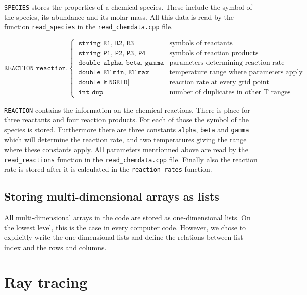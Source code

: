 \documentclass[]{article}
\begin{document}
\texttt{SPECIES} stores the properties of a chemical species. These include the symbol of the species, its abundance and its molar mass. All this data is read by the function \texttt{read\_species} in the \texttt{read\_chemdata.cpp} file.

\begin{equation}
\texttt{REACTION reaction.}
\begin{cases}
\ \texttt{string R1, R2, R3} & \text{symbols of reactants}\\
\ \texttt{string P1, P2, P3, P4} & \text{symbols of reaction products} \\
\ \texttt{double alpha, beta, gamma} &  \text{parameters determining reaction rate} \\
\ \texttt{double RT\_min, RT\_max} &  \text{temperature range where parameters apply} \\
\ \texttt{double k[NGRID]} &  \text{reaction rate at every grid point} \\
\ \texttt{int    dup} &  \text{number of duplicates in other T ranges}
\end{cases}
\end{equation}

\texttt{REACTION} contains the information on the chemical reactions. There is place for three reactants and four reaction products. For each of those the symbol of the species is stored. Furthermore there are three constants \texttt{alpha}, \texttt{beta} and \texttt{gamma} which will determine the reaction rate, and two temperatures giving the range where these constants apply. All parameters mentionned above are read by the \texttt{read\_reactions} function in the \texttt{read\_chemdata.cpp} file. Finally also the reaction rate is stored after it is calculated in the \texttt{reaction\_rates} function.


\subsection{Storing multi-dimensional arrays as lists}

All multi-dimensional arrays in the code are stored as one-dimensional lists. On the lowest level, this is the case in every computer code. However, we chose to explicitly write the one-dimensional lists and define the relations between list index and the rows and columns.

\section{Ray tracing}
\end{document}
